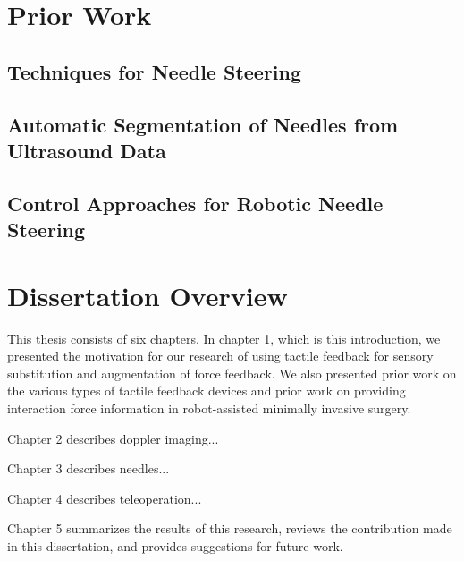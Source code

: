 \section{Prior Work}

\subsection{Techniques for Needle Steering}


\subsection{Automatic Segmentation of Needles from Ultrasound Data}
\cite{Adebar2013}
\cite{Adebar2015}

\subsection{Control Approaches for Robotic Needle Steering}


\section{Dissertation Overview}

This thesis consists of six chapters. In chapter 1, which is this introduction, we presented the motivation for our research of using tactile feedback for sensory substitution and augmentation of force feedback. We also presented prior work on the various types of tactile feedback devices and prior work on providing interaction force information in robot-assisted minimally invasive surgery.

Chapter 2 describes doppler imaging...

Chapter 3 describes needles...

Chapter 4 describes teleoperation...

Chapter 5 summarizes the results of this research, reviews the contribution made in this dissertation, and provides suggestions for future work.
